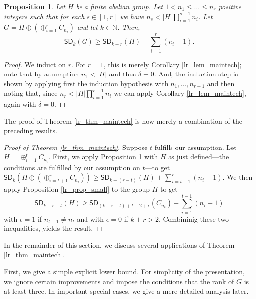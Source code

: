 \documentclass{amsart}
\newtheorem{pro}[thm]{Proposition}
\theoremstyle{definition}
\numberwithin{equation}{section}
\begin{document}
\begin{pro}
\label{lr_prop_large}
Let $H$ be a finite abelian group. Let $1<n_1 \le \dots \le n_r$ positive integers such that for each $s \in [1,r]$ we have $n_s < |H|\prod_{i=1}^{s-1}n_i$. Let $G=H \oplus (\oplus_{i=1}^r C_{n_i})$ and let $k \in \mathbb{N}$. Then,
\[{\mathsf{SD}}_k(G)\ge {\mathsf{SD}}_{k+r}(H)+ \sum_{i=1}^r (n_i-1).\]
\end{pro}
\begin{proof}
We induct on $r$.
For $r=1$, this is merely Corollary \ref{lr_lem_maintech}; note that by assumption $n_1<|H|$ and thus $\delta=0$.
And, the induction-step is shown by applying first the induction hypothesis with $n_1, \dots,n_{r-1}$
and then noting that, since $n_r < |H|\prod_{i=1}^{r-1}n_i$ we can apply Corollary \ref{lr_lem_maintech}, again with $\delta=0$.
\end{proof}

The proof of Theorem \ref{lr_thm_maintech} is now merely a combination of the preceding results.

\begin{proof}[Proof of Theorem \ref{lr_thm_maintech}]
Suppose $t$ fulfills our assumption. Let $H = \oplus_{i=1}^t C_{n_i}$.
First, we apply Proposition \ref{lr_prop_large} with $H$ as just defined---the conditions are fulfilled by our assumption on $t$---to get 
\({\mathsf{SD}}_k(H \oplus (\oplus_{i=t+1}^r C_{n_i})) \ge {\mathsf{SD}}_{k+(r-t)}(H) + \sum_{i=t+1}^r(n_i-1).\)
We then apply Proposition \ref{lr_prop_small} to the group $H$
 to get
\[{\mathsf{SD}}_{k+r-t}(H) \ge {\mathsf{SD}}_{(k+r-t)+t -2 + \epsilon}(C_{n_t}) +\sum_{i=1}^{t-1}(n_i-1)\]
with $\epsilon =1$ if $n_{t-1}\neq n_t$ and with  $\epsilon=0$ if $k+r > 2$.
Combininig these two inequalities, yields the result. 
\end{proof}

In the remainder of this section, we discuss several applications of Theorem \ref{lr_thm_maintech}.

First, we give a simple explicit lower bound. For simplicity of the presentation, we ignore certain improvements and impose the conditions that the rank of $G$ is at least three.
In important special cases, we give a more detailed analysis later.
\end{document}
